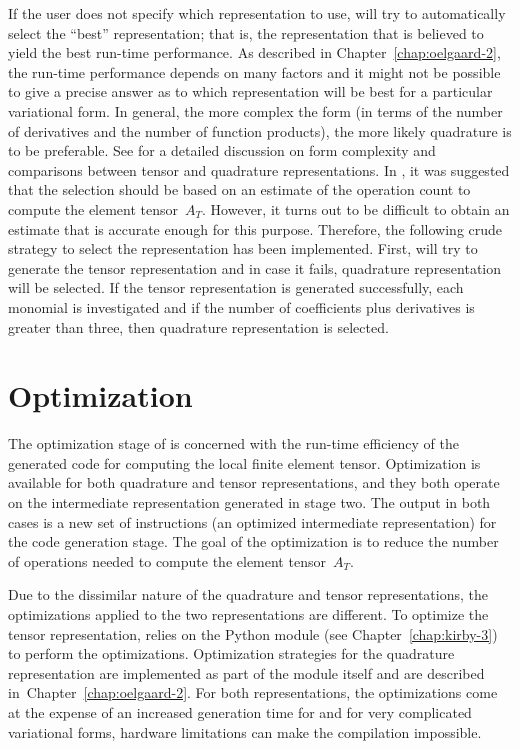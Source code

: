 If the user does not specify which representation to use, \ffc{} will
try to automatically select the ``best'' representation; that is, the
representation that is believed to yield the best run-time
performance. As described in Chapter~\ref{chap:oelgaard-2}, the
run-time performance depends on many factors and it might not be
possible to give a precise \apriori{} answer as to which
representation will be best for a particular variational form. In
general, the more complex the form (in terms of the number of
derivatives and the number of function products), the more likely
quadrature is to be preferable. See \citet{OelgaardWells2010} for a
detailed discussion on form complexity and comparisons between tensor
and quadrature representations. In \citet{OelgaardWells2010}, it was
suggested that the selection should be based on an estimate of the
operation count to compute the element tensor~$A_T$.  However, it
turns out to be difficult to obtain an estimate that is accurate
enough for this purpose. Therefore, the following crude strategy to
select the representation has been implemented. First, \ffc{} will try
to generate the tensor representation and in case it fails, quadrature
representation will be selected. If the tensor representation is
generated successfully, each monomial is investigated and if the
number of coefficients plus derivatives is greater than three, then
quadrature representation is selected.

\enlargethispage{9pt}

\section{Optimization}

The optimization stage of \ffc{} is concerned with the run-time
efficiency of the generated code for computing the local finite
element tensor. Optimization is available for both quadrature and
tensor representations, and they both operate on the intermediate
representation generated in stage two. The output in both cases is a
new set of instructions (an optimized intermediate representation) for
the code generation stage. The goal of the optimization is to reduce
the number of operations needed to compute the element tensor~$A_T$.

Due to the dissimilar nature of the quadrature and tensor representations,
the optimizations applied to the two representations are different.
To optimize the tensor representation, \ffc{} relies on the Python
module \ferari{} (see Chapter~\ref{chap:kirby-3}) to perform the
optimizations. Optimization strategies for the quadrature representation
are implemented as part of the \ffc{} module itself and are described
in~Chapter~\ref{chap:oelgaard-2}.  For both representations, the
optimizations come at the expense of an increased generation time for
\ffc{} and for very complicated variational forms, hardware limitations
can make the compilation impossible.


